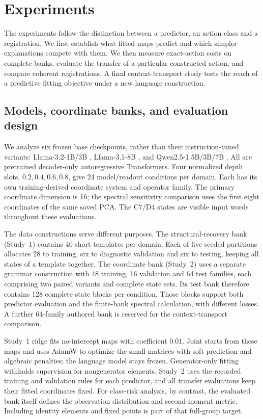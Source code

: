 \section{Experiments}
\label{sec:pending-studies}
\label{sec:evidence}
The experiments follow the distinction between a predictor, an action class and a registration. We first establish what fitted maps predict and which simpler explanations compete with them. We then measure exact-action costs on complete banks, evaluate the transfer of a particular constructed action, and compare coherent registrations. A final context-transport study tests the reach of a predictive fitting objective under a new language construction.

\subsection{Models, coordinate banks, and evaluation design}
\label{sec:design}
We analyze six frozen base checkpoints, rather than their instruction-tuned variants: Llama-3.2-1B/3B \citep{meta2024llama32}, Llama-3.1-8B \citep{grattafiori2024llama3}, and Qwen2.5-1.5B/3B/7B \citep{qwen2025technical}. All are pretrained decoder-only autoregressive Transformers. Four normalized depth slots, $0.2,0.4,0.6,0.8$, give 24 model/readout conditions per domain. Each has its own training-derived coordinate system and operator family. The primary coordinate dimension is 16; the spectral sensitivity comparison uses the first eight coordinates of the same saved PCA. The C7/D4 states are visible input words throughout these evaluations.

The data constructions serve different purposes. The structural-recovery bank (Study~1) contains 40 short templates per domain. Each of five seeded partitions allocates 28 to training, six to diagnostic validation and six to testing, keeping all states of a template together. The coordinate bank (Study~2) uses a separate grammar construction with 48 training, 16 validation and 64 test families, each comprising two paired variants and complete state sets. Its test bank therefore contains 128 complete state blocks per condition. Those blocks support both predictor evaluation and the finite-bank spectral calculation, with different losses. A further 64-family authored bank is reserved for the context-transport comparison.

\hypertarget{par:estimation}{}
Study~1 ridge fits no-intercept maps with coefficient $0.01$. Joint starts from these maps and uses AdamW \citep{loshchilov2019decoupled} to optimize the small matrices with soft prediction and algebraic penalties; the language model stays frozen. Generator-only fitting withholds supervision for nongenerator elements. Study~2 uses the recorded training and validation rules for each predictor, and all transfer evaluations keep their fitted coordinates fixed. For class-risk analysis, by contrast, the evaluated bank itself defines the observation distribution and second-moment metric. Including identity elements and fixed points is part of that full-group target.

